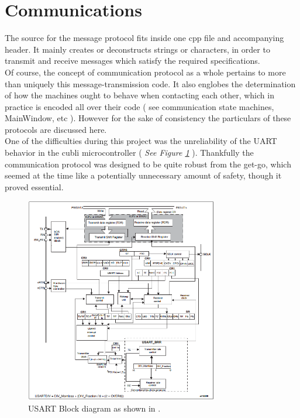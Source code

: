 \section{Communications}

The source for the message protocol fits inside one cpp file and accompanying header. It mainly creates or deconstructs strings or characters, in order to transmit and receive messages which satisfy the required specifications.\\

Of course, the concept of communication protocol as a whole pertains to more than uniquely this message-transmission code. It also englobes the determination of how the machines ought to behave when contacting each other, which in practice is encoded all over their code ( see communication state machines, MainWindow, etc ). However for the sake of consistency the particulars of these protocols are discussed here.\\

One of the difficulties during this project was the unreliability of the UART behavior in the cubli microcontroller ( \textit{See Figure \ref{img:USART}} ). Thankfully the communication protocol was designed to be quite robust from the get-go, which seemed at the time like a potentially unnecessary amount of safety, though it proved essential.

\begin{figure}[ht]
   \centering
   \includegraphics[width=0.75\textwidth]{img/USART.png}
   \caption{USART Block diagram as shown in \cite{stm32manual}.}
   \label{img:USART}
\end{figure}

